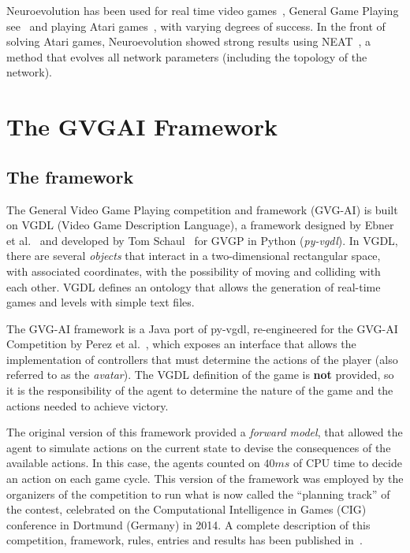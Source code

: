 \documentclass[conference]{IEEEtran}
\begin{document}
Neuroevolution has been used for real time video games~\cite{stanley2005real},  General Game Playing see~\cite{reisinger2007coevolving} and playing Atari games~\cite{hausknecht2012hyperneat}, with varying degrees of success. In the front of solving Atari games, Neuroevolution showed strong results using NEAT~\cite{stanley2002efficient}, a method that evolves all network parameters (including the topology of the network). 



\section{The GVGAI Framework} \label{sec:framework}


\subsection{The framework} \label{ssec:framework}

The General Video Game Playing competition and framework (GVG-AI) is built on VGDL (Video Game Description Language), a framework designed by Ebner et al.~\cite{Ebner2013} and developed by Tom Schaul~\cite{schaul2013pyvgdl} for GVGP in Python (\textit{py-vgdl}). In VGDL, there are several \textit{objects} that interact in a two-dimensional rectangular space, with associated coordinates, with the possibility of moving and colliding with each other. VGDL defines an ontology that allows the generation of real-time games and levels with simple text files.

The GVG-AI framework is a Java port of py-vgdl, re-engineered for the GVG-AI Competition by Perez et al.~\cite{Perez2015}, which exposes an interface that allows the implementation of controllers that must determine the actions of the player (also referred to as the \textit{avatar}). The VGDL definition of the game is \textbf{not} provided, so it is the responsibility of the agent to determine the nature of the game and the actions needed to achieve victory. 

The original version of this framework provided a \textit{forward model}, that allowed the agent to simulate actions on the current state to devise the consequences of the available actions. In this case, the agents counted on $40ms$ of CPU time to decide an action on each game cycle. This version of the framework was employed by the organizers of the competition to run what is now called the ``planning track'' of the contest, celebrated on the Computational Intelligence in Games (CIG) conference in Dortmund (Germany) in 2014. A complete description of this competition, framework, rules, entries and results has been published in~\cite{Perez2015}.
\end{document}
